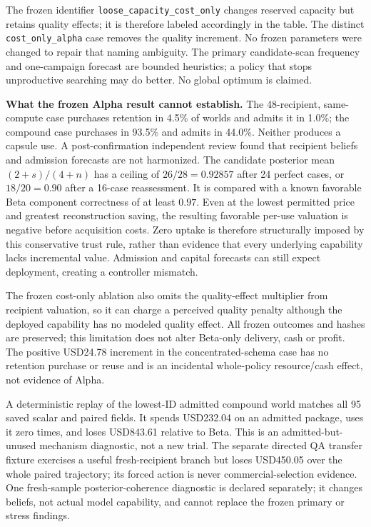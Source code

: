 The frozen identifier \texttt{loose\_capacity\_cost\_only} changes reserved capacity but retains quality effects; it is therefore labeled accordingly in the table. The distinct \texttt{cost\_only\_alpha} case removes the quality increment. No frozen parameters were changed to repair that naming ambiguity. The primary candidate-scan frequency and one-campaign forecast are bounded heuristics; a policy that stops unproductive searching may do better. No global optimum is claimed.

\textbf{What the frozen Alpha result cannot establish.} The 48-recipient, same-compute case purchases retention in 4.5\% of worlds and admits it in 1.0\%; the compound case purchases in 93.5\% and admits in 44.0\%. Neither produces a capsule use. A post-confirmation independent review found that recipient beliefs and admission forecasts are not harmonized. The candidate posterior mean $(2+s)/(4+n)$ has a ceiling of $26/28=0.92857$ after 24 perfect cases, or $18/20=0.90$ after a 16-case reassessment. It is compared with a known favorable Beta component correctness of at least $0.97$. Even at the lowest permitted price and greatest reconstruction saving, the resulting favorable per-use valuation is negative before acquisition costs. Zero uptake is therefore structurally imposed by this conservative trust rule, rather than evidence that every underlying capability lacks incremental value. Admission and capital forecasts can still expect deployment, creating a controller mismatch.

The frozen cost-only ablation also omits the quality-effect multiplier from recipient valuation, so it can charge a perceived quality penalty although the deployed capability has no modeled quality effect. All frozen outcomes and hashes are preserved; this limitation does not alter Beta-only delivery, cash or profit. The positive USD24.78 increment in the concentrated-schema case has no retention purchase or reuse and is an incidental whole-policy resource/cash effect, not evidence of Alpha.

A deterministic replay of the lowest-ID admitted compound world matches all 95 saved scalar and paired fields. It spends USD232.04 on an admitted package, uses it zero times, and loses USD843.61 relative to Beta. This is an admitted-but-unused mechanism diagnostic, not a new trial. The separate directed QA transfer fixture exercises a useful fresh-recipient branch but loses USD450.05 over the whole paired trajectory; its forced action is never commercial-selection evidence. One fresh-sample posterior-coherence diagnostic is declared separately; it changes beliefs, not actual model capability, and cannot replace the frozen primary or stress findings.
